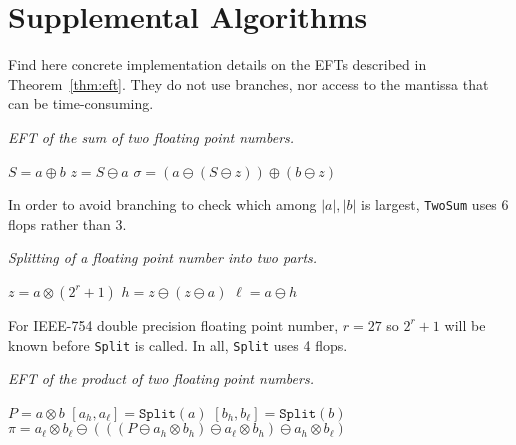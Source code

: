 \chapter{Supplemental Algorithms}\label{chap:appendix-algo}

Find here concrete implementation details on the EFTs described
in Theorem~\ref{thm:eft}. They do not use branches, nor access to the
mantissa that can be time-consuming.

\begin{breakablealgorithm}
  \caption{\textit{EFT of the sum of two floating point numbers.}}

  \begin{algorithmic}
      \State \(S = a \oplus b\)
      \State \(z = S \ominus a\)
      \State \(\sigma = (a \ominus (S \ominus z)) \oplus (b \ominus z)\)
    \EndFunction
  \end{algorithmic}
\end{breakablealgorithm}

\noindent In order to avoid branching to check which among
\(\left|a\right|, \left|b\right|\) is largest, \texttt{TwoSum} uses 6 flops
rather than 3.

\begin{breakablealgorithm}
  \caption{\textit{Splitting of a floating point number into two parts.}}

  \begin{algorithmic}
      \State \(z = a \otimes (2^r + 1)\)
      \State \(h = z \ominus (z \ominus a)\)
      \State \(\ell = a \ominus h\)
    \EndFunction
  \end{algorithmic}
\end{breakablealgorithm}

\noindent For IEEE-754 double precision floating point number, \(r = 27\)
so \(2^r + 1\) will be known before \texttt{Split} is called. In all,
\texttt{Split} uses 4 flops.

\begin{breakablealgorithm}
  \caption{\textit{EFT of the product of two floating point numbers.}}

  \begin{algorithmic}
      \State \(P = a \otimes b\)
      \State \(\left[a_h, a_{\ell}\right] = \mathtt{Split}(a)\)
      \State \(\left[b_h, b_{\ell}\right] = \mathtt{Split}(b)\)
      \State \(\pi = a_{\ell} \otimes b_{\ell} \ominus (((P \ominus
          a_h \otimes b_h)
          \ominus a_{\ell} \otimes b_h) \ominus a_h \otimes b_{\ell})\)
    \EndFunction
  \end{algorithmic}
\end{breakablealgorithm}

